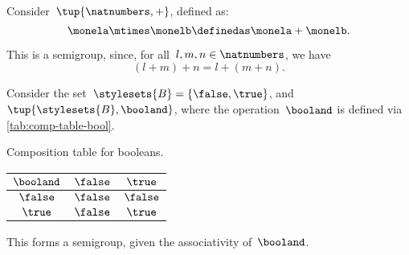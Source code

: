 \begin{example}
    \label{exa:natnum-semigroup}
    Consider~$\tup{\natnumbers,+}$, defined as:
    \begin{equation*}
        \label{eq:natnum-semigroup-definition}
        \monela \mtimes \monelb \definedas  \monela + \monelb.
    \end{equation*}

    This is a semigroup, since, for all~$l,m, n \in \natnumbers$, we have
    \begin{equation}
        (l+m)
        +n
        =l+(m+n).
    \end{equation}
\end{example}


\begin{example}[Booleans]
    \label{exa:booleans-table}
    \label{ex:bool_semigroup}
    Consider the set~$\stylesets{B}=\{\false, \true\}$, and~$\tup{\stylesets{B},\booland}$, where the operation~$\booland$ is defined via \cref{tab:comp-table-bool}.

    \begin{margintable}
        \caption{Composition table for booleans.}
        \label{tab:comp-table-bool}
        \begin{tabular}{c|cc}
            $\booland$ & $\false$ & $\true$  \\
            \hline
            $\false$   & $\false$ & $\false$ \\
            $\true$    & $\false$ & $\true$
        \end{tabular}
    \end{margintable}

    This forms a semigroup, given the associativity of~$\booland$.
\end{example}

